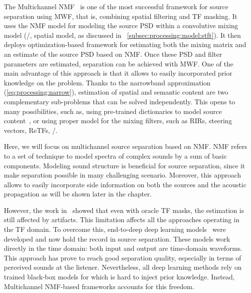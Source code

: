 \mynewline
The Multichannel \ac{NMF}~ is one of the most successful framework for source separation using \ac{MWF}, that is, combining spatial filtering and \ac{TF} masking.
It uses the \ac{NMF} model for modeling the source \ac{PSD} within a convolutive mixing model (\ie/, spatial model, as discussed in ~\cref{subsec:processing:model:stft}).
It then deploys optimization-based framework for estimating both the mixing matrix and an estimate of the source \ac{PSD} based on \ac{NMF}.
Once these \ac{PSD} and filter parameters are estimated, separation can be achieved with \ac{MWF}.
One of the main advantage of this approach is that it allows to easily incorporated prior knowledge on the problem.
Thanks to the narrowband approximation (\cref{eq:processing:narrow}), estimation of spatial and semantic content are two complementary sub-problems that can be solved independently.
This opens to many possibilities, such as, using pre-trained dictionaries to model source content~, or using proper model for the mixing filters, such as \acp{RIR}, steering vectors, \acp{ReTF}, \etc/.

\mynewline
Here, we will focus on multichannel source separation based on \acf{NMF}.
\ac{NMF} refers to a set of technique to model spectra of complex sounds by a sum of basic components.
Modeling sound structure is beneficial for source separation, since it make separation possible in many challenging scenario.
Moreover, this approach allows to easily incorporate side information on both the sources and the acoustic propagation as will be shown later in the chapter.

\mynewline
However, the work in~ showed that even with oracle \ac{TF} masks, the estimation is still affected by artifacts.
This limitation affects all the approaches operating in the \ac{TF} domain.
To overcome this, end-to-deep deep learning models~ were developed and now hold the record in source separation.
These models work directly in the time domain: both input and output are time-domain waveforms.
This approach has prove to reach good separation quality, especially in terms of perceived sounds at the listener.
Nevertheless, all deep learning methods rely on trained black-box models for which is hard to inject prior knowledge.
Instead, Multichannel NMF-based frameworks accounts for this freedom.

